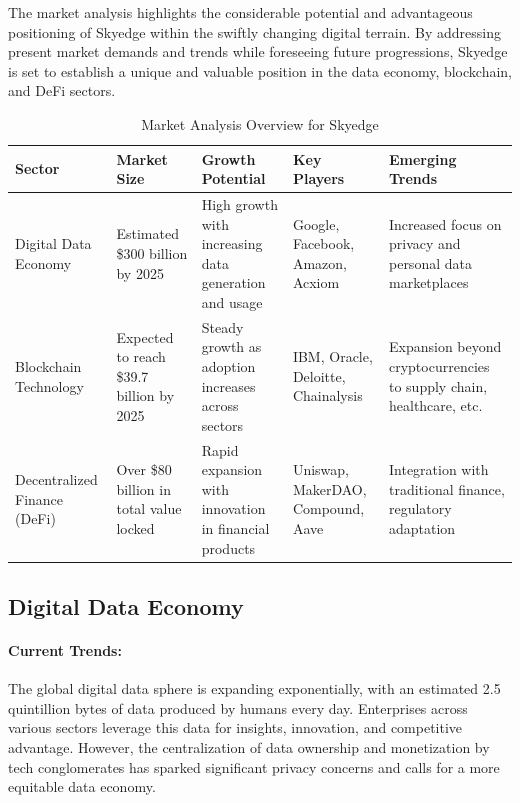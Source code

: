 \documentclass{article}
\begin{document}
The market analysis highlights the considerable potential and advantageous positioning of Skyedge within the swiftly changing digital terrain. By addressing present market demands and trends while foreseeing future progressions, Skyedge is set to establish a unique and valuable position in the data economy, blockchain, and DeFi sectors.

\begin{table}[h!]
\centering
\begin{tabular}{|p{2cm}|p{3cm}|p{3cm}|p{3cm}|p{3cm}|}
\hline
\textbf{Sector} & \textbf{Market Size} & \textbf{Growth Potential} & \textbf{Key Players} & \textbf{Emerging Trends}\\
\hline
Digital Data Economy & Estimated \$300 billion by 2025 & High growth with increasing data generation and usage & Google, Facebook, Amazon, Acxiom & Increased focus on privacy and personal data marketplaces \\
\hline
Blockchain Technology & Expected to reach \$39.7 billion by 2025 & Steady growth as adoption increases across sectors & IBM, Oracle, Deloitte, Chainalysis & Expansion beyond cryptocurrencies to supply chain, healthcare, etc.\\
\hline
Decentralized Finance (DeFi) & Over \$80 billion in total value locked & Rapid expansion with innovation in financial products & Uniswap, MakerDAO, Compound, Aave & Integration with traditional finance, regulatory adaptation\\
\hline
\end{tabular}
\caption{Market Analysis Overview for Skyedge}
\label{tab:market_analysis}
\end{table}


\subsection{Digital Data Economy}

\paragraph{Current Trends:} The global digital data sphere is expanding exponentially, with an estimated 2.5 quintillion bytes of data produced by humans every day. Enterprises across various sectors leverage this data for insights, innovation, and competitive advantage. However, the centralization of data ownership and monetization by tech conglomerates has sparked significant privacy concerns and calls for a more equitable data economy.
\end{document}

